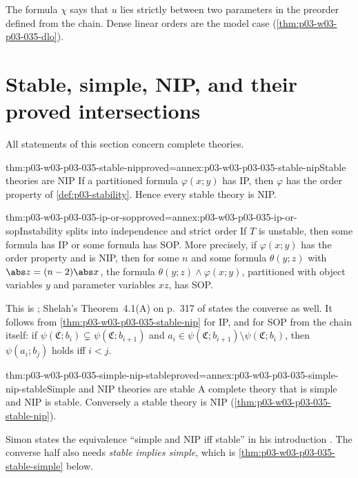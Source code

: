 The formula \(\chi\) says that \(u\) lies strictly between two parameters in
the preorder defined from the chain.  Dense linear orders are the model case
(\cref{thm:p03-w03-p03-035-dlo}).

\section{Stable, simple, NIP, and their proved intersections}
\label{sec:p03-w03-p03-035-intersections}

All statements of this section concern complete theories.

\begin{hbtheorem}{thm:p03-w03-p03-035-stable-nip}{proved=annex:p03-w03-p03-035-stable-nip}{Stable theories are NIP}
If a partitioned formula \(\varphi(x;y)\) has IP, then \(\varphi\) has the
order property of \cref{def:p03-stability}.  Hence every stable theory is NIP.
\end{hbtheorem}

\begin{hbtheorem}{thm:p03-w03-p03-035-ip-or-sop}{proved=annex:p03-w03-p03-035-ip-or-sop}{Instability splits into independence and strict order}
If \(T\) is unstable, then some formula has IP or some formula has SOP.
More precisely, if \(\varphi(x;y)\) has the order property and is NIP, then
for some \(n\) and some formula \(\theta(y;z)\) with \(\abs z=(n-2)\abs x\),
the formula \(\theta(y;z)\wedge\varphi(x;y)\), partitioned with object
variables \(y\) and parameter variables \(x z\), has SOP.
\end{hbtheorem}

This is \cite[Theorem~2.67, pp.~33--34]{Simon2015GuideManuscript}; Shelah's
Theorem~4.1(A) on p.~317 of \cite{Shelah1971Stability} states the converse as
well.  It follows from \cref{thm:p03-w03-p03-035-stable-nip} for IP, and for
SOP from the chain itself: if
\(\psi(\mathfrak C;b_i)\subsetneq\psi(\mathfrak C;b_{i+1})\) and
\(a_i\in\psi(\mathfrak C;b_{i+1})\setminus\psi(\mathfrak C;b_i)\), then
\(\psi(a_i;b_j)\) holds iff \(i<j\).

\begin{hbcorollary}{thm:p03-w03-p03-035-simple-nip-stable}{proved=annex:p03-w03-p03-035-simple-nip-stable}{Simple and NIP theories are stable}
A complete theory that is simple and NIP is stable.  Conversely a stable
theory is NIP (\cref{thm:p03-w03-p03-035-stable-nip}).
\end{hbcorollary}

Simon states the equivalence ``simple and NIP iff stable'' in his
introduction \cite[p.~9]{Simon2015GuideManuscript}.  The converse half also
needs \emph{stable implies simple}, which is
\cref{thm:p03-w03-p03-035-stable-simple} below.

